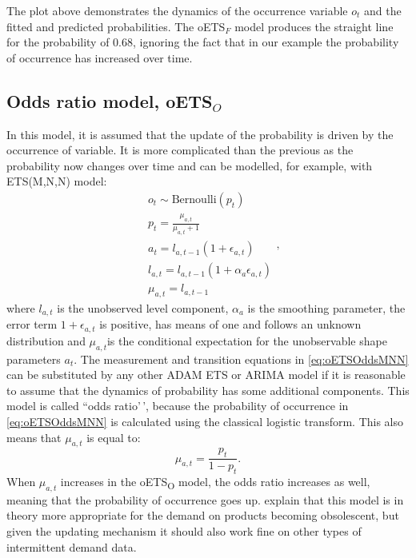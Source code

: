 \documentclass[
]{book}
\theoremstyle{definition}
\theoremstyle{definition}
\theoremstyle{definition}
\theoremstyle{definition}
\theoremstyle{remark}
\begin{document}
The plot above demonstrates the dynamics of the occurrence variable \(o_t\) and the fitted and predicted probabilities. The oETS\(_F\) model produces the straight line for the probability of 0.68, ignoring the fact that in our example the probability of occurrence has increased over time.

\hypertarget{oETSO}{%
\subsection{\texorpdfstring{Odds ratio model, oETS\(_O\)}{Odds ratio model, oETS\_O}}\label{oETSO}}

In this model, it is assumed that the update of the probability is driven by the occurrence of variable. It is more complicated than the previous as the probability now changes over time and can be modelled, for example, with ETS(M,N,N) model:
\begin{equation}
    \begin{aligned}
        & o_t \sim \text{Bernoulli} \left(p_t \right) \\
        & p_t = \frac{\mu_{a,t}}{\mu_{a,t}+1} \\
        & a_t = l_{a,t-1} \left(1 + \epsilon_{a,t} \right) \\
        & l_{a,t} = l_{a,t-1}( 1  + \alpha_{a} \epsilon_{a,t}) \\
        & \mu_{a,t} = l_{a,t-1}
    \end{aligned},
    \label{eq:oETSOddsMNN}
\end{equation}
where \(l_{a,t}\) is the unobserved level component, \(\alpha_{a}\) is the smoothing parameter, the error term \(1+\epsilon_{a,t}\) is positive, has means of one and follows an unknown distribution and \(\mu_{a,t}\)is the conditional expectation for the unobservable shape parameters \(a_t\). The measurement and transition equations in \eqref{eq:oETSOddsMNN} can be substituted by any other ADAM ETS or ARIMA model if it is reasonable to assume that the dynamics of probability has some additional components. This model is called ``odds ratio'\,', because the probability of occurrence in \eqref{eq:oETSOddsMNN} is calculated using the classical logistic transform. This also means that \(\mu_{a,t}\) is equal to:
\begin{equation} \label{eq:oETS_O_oddsRatio}
    \mu_{a,t} = \frac{p_t}{1 - p_t} .
\end{equation}
When \(\mu_{a,t}\) increases in the oETS\textsubscript{O} model, the odds ratio increases as well, meaning that the probability of occurrence goes up. \citet{Svetunkov2019a} explain that this model is in theory more appropriate for the demand on products becoming obsolescent, but given the updating mechanism it should also work fine on other types of intermittent demand data.
\end{document}
